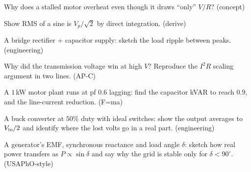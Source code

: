 \begin{exercise}[medium]
Why does a stalled motor overheat even though it draws ``only''
$V/R$? (concept)
\end{exercise}
\begin{exercise}[medium]
Show RMS of a sine is $V_p/\sqrt2$ by direct integration. (derive)
\end{exercise}
\begin{exercise}[medium]
A bridge rectifier + capacitor supply: sketch the load ripple between
peaks. (engineering)
\end{exercise}
\begin{exercise}[easy]
Why did the transmission voltage win at high $V$? Reproduce the
$I^{2}R$ scaling argument in two lines. (AP-C)
\end{exercise}
\begin{exercise}[medium]
A $1$\,kW motor plant runs at pf $0.6$ lagging: find the capacitor
kVAR to reach $0.9$, and the line-current reduction. (F=ma)
\end{exercise}
\begin{exercise}[medium]
A buck converter at $50\%$ duty with ideal switches: show the output
averages to $V_{\rm in}/2$ and identify where the lost volts go in a
real part. (engineering)
\end{exercise}
\begin{exercise}[hard]
A generator's EMF, synchronous reactance and load angle $\delta$:
sketch how real power transfers as $P\propto\sin\delta$ and say why
the grid is stable only for $\delta<90^{\circ}$. (USAPhO-style)
\end{exercise}
